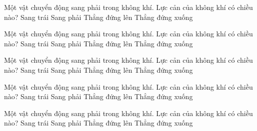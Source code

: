

\begin{ex}
Một vật chuyển động sang phải trong không khí. Lực cản của không khí có chiều nào?
\choice
{\True Sang trái}
{Sang phải}
{Thẳng đứng lên}
{Thẳng đứng xuống}
\end{ex}

\begin{ex}
Một vật chuyển động sang phải trong không khí. Lực cản của không khí có chiều nào?
\choice
{\True Sang trái}
{Sang phải}
{Thẳng đứng lên}
{Thẳng đứng xuống}
\end{ex}

\begin{ex}
Một vật chuyển động sang phải trong không khí. Lực cản của không khí có chiều nào?
\choice
{\True Sang trái}
{Sang phải}
{Thẳng đứng lên}
{Thẳng đứng xuống}
\end{ex}

\begin{ex}
Một vật chuyển động sang phải trong không khí. Lực cản của không khí có chiều nào?
\choice
{\True Sang trái}
{Sang phải}
{Thẳng đứng lên}
{Thẳng đứng xuống}
\end{ex}

\begin{ex}
Một vật chuyển động sang phải trong không khí. Lực cản của không khí có chiều nào?
\choice
{\True Sang trái}
{Sang phải}
{Thẳng đứng lên}
{Thẳng đứng xuống}
\end{ex}

